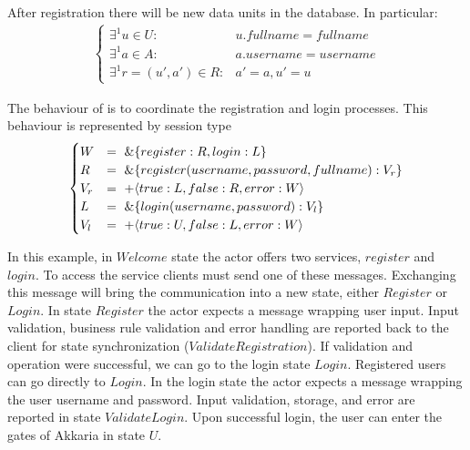 %
After registration there will be new data units in the database. In
particular:
\begin{align}
  \begin{cases}
    \exists^1 u \in U:& u.fullname = fullname\\
    \exists^1 a \in A:& a.username = username\\
    \exists^1 r=(u',a') \in R:& a' = a, u' = u
  \end{cases}
\end{align}
%
\par
%
The behaviour of  is to coordinate the registration
and login processes. This behaviour is represented by session type
\begin{align}
  \begin{cases}
    W &=\ \& \{register: R, login: L\}\\
    R &=\ \& \{register(username,password,fullname): V_r\}\\
    V_r &=\ + \langle true: L, false: R, error: W \rangle\\
    L &=\ \& \{login(username, password): V_l\}\\
    V_l &=\ + \langle true: U, false: L, error: W \rangle
  \end{cases}
          \label{eq:session-type-wa}
\end{align}
%

%
In this example, in $Welcome$ state the actor offers two services,
$register$ and $login$. To access the service clients must send one of
these messages. Exchanging this message will bring the communication
into a new state, either $Register$ or $Login$.
%
In state $Register$ the actor expects a message wrapping user
input. Input validation, business rule validation and error handling
are reported back to the client for state synchronization
($Validate Registration$).
%
If validation and operation were successful, we can go to the login
state $Login$. Registered users can go directly to $Login$.
%
In the login state the actor expects a message wrapping the user
username and password. Input validation, storage, and error are
reported in state $Validate Login$. Upon successful login, the user
can enter the gates of Akkaria in state $U$.
%

%

%

%

%
% 



